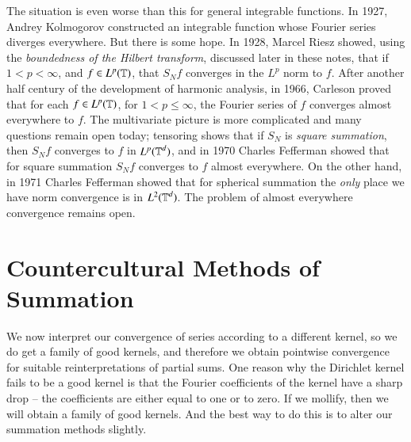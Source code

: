 The situation is even worse than this for general integrable functions. In 1927, Andrey Kolmogorov constructed an integrable function whose Fourier series diverges everywhere. But there is some hope. In 1928, Marcel Riesz showed, using the \emph{boundedness of the Hilbert transform}, discussed later in these notes, that if $1 < p < \infty$, and $f \in L^p(\operatorname{\mathbb{T}})$, that $S_N f$ converges in the $L^p$ norm to $f$. After another half century of the development of harmonic analysis, in 1966, Carleson proved that for each $f \in L^p(\operatorname{\mathbb{T}})$, for $1 < p \leq \infty$, the Fourier series of $f$ converges almost everywhere to $f$. The multivariate picture is more complicated and many questions remain open today; tensoring shows that if $S_N$ is \emph{square summation}, then $S_N f$ converges to $f$ in $L^p(\operatorname{\mathbb{T}}^d)$, and in 1970 Charles Fefferman showed that for square summation $S_N f$ converges to $f$ almost everywhere. On the other hand, in 1971 Charles Fefferman showed that for spherical summation the \emph{only} place we have norm convergence is in $L^2(\operatorname{\mathbb{T}}^d)$. The problem of almost everywhere convergence remains open.

\section{Countercultural Methods of Summation}

We now interpret our convergence of series according to a different kernel, so we do get a family of good kernels, and therefore we obtain pointwise convergence for suitable reinterpretations of partial sums. One reason why the Dirichlet kernel fails to be a good kernel is that the Fourier coefficients of the kernel have a sharp drop -- the coefficients are either equal to one or to zero. If we mollify, then we will obtain a family of good kernels. And the best way to do this is to alter our summation methods slightly.

